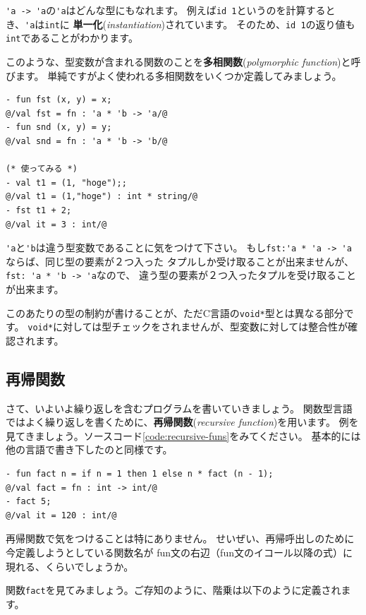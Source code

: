 \documentclass[11pt,a4paper]{article}
\begin{document}
\lstinline{'a -> 'a}の\lstinline{'a}はどんな型にもなれます。
例えば\lstinline{id 1}というのを計算するとき、\lstinline{'a}は\lstinline{int}に
{\bfseries 単一化}({\itshape instantiation})されています。
そのため、\lstinline{id 1}の返り値も\lstinline{int}であることがわかります。

このような、型変数が含まれる関数のことを{\bfseries 多相関数}({\itshape polymorphic function})と呼びます。
単純ですがよく使われる多相関数をいくつか定義してみましょう。

\begin{lstlisting}[caption=多相関数たち,label=code:poly]
- fun fst (x, y) = x;
@/val fst = fn : 'a * 'b -> 'a/@
- fun snd (x, y) = y;
@/val snd = fn : 'a * 'b -> 'b/@

(* 使ってみる *)
- val t1 = (1, "hoge");;
@/val t1 = (1,"hoge") : int * string/@
- fst t1 + 2;
@/val it = 3 : int/@
\end{lstlisting}

\lstinline{'a}と\lstinline{'b}は違う型変数であることに気をつけて下さい。
もし\lstinline{fst:'a * 'a -> 'a}ならば、同じ型の要素が２つ入った
タプルしか受け取ることが出来ませんが、\lstinline{fst: 'a * 'b -> 'a}なので、
違う型の要素が２つ入ったタプルを受け取ることが出来ます。

このあたりの型の制約が書けることが、ただC言語の\lstinline{void*}型とは異なる部分です。
\lstinline{void*}に対しては型チェックをされませんが、型変数に対しては整合性が確認されます。

\subsection{再帰関数}

さて、いよいよ繰り返しを含むプログラムを書いていきましょう。
関数型言語ではよく繰り返しを書くために、{\bfseries 再帰関数}({\itshape recursive function})を用います。
例を見てきましょう。ソースコード\ref{code:recursive-funs}をみてください。
基本的には他の言語で書き下したのと同様です。

\begin{lstlisting}[caption=再帰関数,label=code:recursive-funs]
- fun fact n = if n = 1 then 1 else n * fact (n - 1);
@/val fact = fn : int -> int/@
- fact 5;
@/val it = 120 : int/@
\end{lstlisting}

再帰関数で気をつけることは特にありません。
せいぜい、再帰呼出しのために今定義しようとしている関数名が
fun文の右辺（fun文のイコール以降の式）に現れる、くらいでしょうか。

関数\lstinline{fact}を見てみましょう。ご存知のように、階乗は以下のように定義されます。
\end{document}
